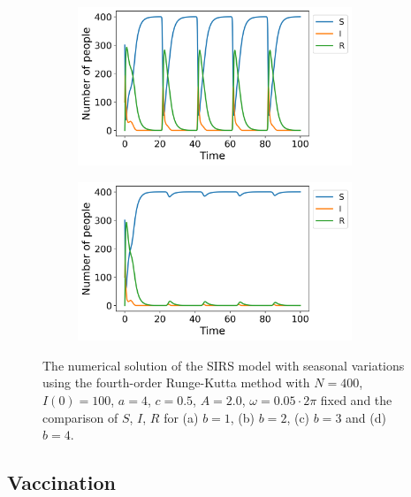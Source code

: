\documentclass[../main.tex]{subfiles}
\begin{document}
\begin{figure}[htb!]
    \begin{subfigure}[b]{0.475\textwidth}
    \centering
    \includegraphics[width=0.9\textwidth]{../figures/SIRS_harmonical_rk4_b=3.png}
    \caption{}
    \label{fig:seasonal_b=3}
    \end{subfigure}
    \quad
    \begin{subfigure}[b]{0.475\textwidth}
    \includegraphics[width=0.9\textwidth]{../figures/SIRS_harmonical_rk4_b=4.png}
    \caption{}
    \label{fig:seasonal_b=4}
    \end{subfigure}
    \caption{The numerical solution of the SIRS model with seasonal variations using the fourth-order Runge-Kutta method with $N=400$, $I(0)=100$, $a=4$, $c=0.5$, $A=2.0$, $\omega=0.05\cdot2\pi$ fixed and the comparison of $S$, $I$, $R$ for (a)  $b=1$, (b) $b=2$, (c) $b=3$ and (d) $b=4$.}
    \label{fig:SIRS_rk4_seasonal}
\end{figure}
\subsection{Vaccination}
\end{document}
